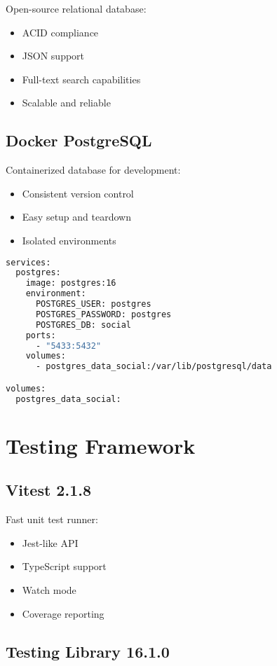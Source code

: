 \documentclass[12pt,a4paper]{report}
\begin{document}
Open-source relational database:
\begin{itemize}
    \item ACID compliance
    \item JSON support
    \item Full-text search capabilities
    \item Scalable and reliable
\end{itemize}

\subsection{Docker PostgreSQL}

Containerized database for development:
\begin{itemize}
    \item Consistent version control
    \item Easy setup and teardown
    \item Isolated environments
\end{itemize}

\begin{lstlisting}[language=bash, caption=Docker Compose Configuration]
services:
  postgres:
    image: postgres:16
    environment:
      POSTGRES_USER: postgres
      POSTGRES_PASSWORD: postgres
      POSTGRES_DB: social
    ports:
      - "5433:5432"
    volumes:
      - postgres_data_social:/var/lib/postgresql/data

volumes:
  postgres_data_social:
\end{lstlisting}

\section{Testing Framework}

\subsection{Vitest 2.1.8}

Fast unit test runner:
\begin{itemize}
    \item Jest-like API
    \item TypeScript support
    \item Watch mode
    \item Coverage reporting
\end{itemize}

\subsection{Testing Library 16.1.0}
\end{document}
